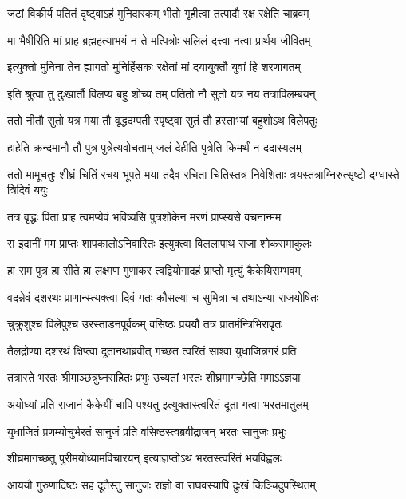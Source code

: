 \twolineshloka
{जटां विकीर्य पतितं दृष्ट्वाऽहं मुनिदारकम्}
{भीतो गृहीत्वा तत्पादौ रक्ष रक्षेति चाब्रवम्} %

\twolineshloka
{मा भैषीरिति मां प्राह ब्रह्महत्याभयं न ते}
{मत्पित्रोः सलिलं दत्त्वा नत्वा प्रार्थय जीवितम्} %

\twolineshloka
{इत्युक्तो मुनिना तेन ह्यागतो मुनिहिंसकः}
{रक्षेतां मां दयायुक्तौ युवां हि शरणागतम्} %

\twolineshloka
{इति श्रुत्वा तु दुःखार्तौ विलप्य बहु शोच्य तम्}
{पतितो नौ सुतो यत्र नय तत्राविलम्बयन्} %

\twolineshloka
{ततो नीतौ सुतो यत्र मया तौ वृद्धदम्पती}
{स्पृष्ट्वा सुतं तौ हस्ताभ्यां बहुशोऽथ विलेपतुः} %

\twolineshloka
{हाहेति क्रन्दमानौ तौ पुत्र पुत्रेत्यवोचताम्}
{जलं देहीति पुत्रेति किमर्थं न ददास्यलम्} %

\threelineshloka
{ततो मामूचतुः शीघ्रं चितिं रचय भूपते}
{मया तदैव रचिता चितिस्तत्र निवेशिताः}
{त्रयस्तत्राग्निरुत्सृष्टो दग्धास्ते त्रिदिवं ययुः} %

\twolineshloka
{तत्र वृद्धः पिता प्राह त्वमप्येवं भविष्यसि}
{पुत्रशोकेन मरणं प्राप्स्यसे वचनान्मम} %

\twolineshloka
{स इदानीं मम प्राप्तः शापकालोऽनिवारितः}
{इत्युक्त्वा विललापाथ राजा शोकसमाकुलः} %

\twolineshloka
{हा राम पुत्र हा सीते हा लक्ष्मण गुणाकर}
{त्वद्वियोगादहं प्राप्तो मृत्युं कैकेयिसम्भवम्} %

\twolineshloka
{वदन्नेवं दशरथः प्राणान्स्त्यक्त्वा दिवं गतः}
{कौसल्या च सुमित्रा च तथाऽन्या राजयोषितः} %

\twolineshloka
{चुक्रुशुश्च विलेपुश्च उरस्ताडनपूर्वकम्}
{वसिष्ठः प्रययौ तत्र प्रातर्मन्त्रिभिरावृतः} %

\twolineshloka
{तैलद्रोण्यां दशरथं क्षिप्त्वा दूतानथाब्रवीत्}
{गच्छत त्वरितं साश्वा युधाजिन्नगरं प्रति} %

\twolineshloka
{तत्रास्ते भरतः श्रीमाञ्छत्रुघ्नसहितः प्रभुः}
{उच्यतां भरतः शीघ्रमागच्छेति ममाऽऽज्ञया} %

\twolineshloka
{अयोध्यां प्रति राजानं कैकेयीं चापि पश्यतु}
{इत्युक्तास्त्वरितं दूता गत्वा भरतमातुलम्} %

\twolineshloka
{युधाजितं प्रणम्योचुर्भरतं सानुजं प्रति}
{वसिष्ठस्त्वब्रवीद्राजन् भरतः सानुजः प्रभुः} %

\twolineshloka
{शीघ्रमागच्छतु पुरीमयोध्यामविचारयन्}
{इत्याज्ञप्तोऽथ भरतस्त्वरितं भयविह्वलः} %

\twolineshloka
{आययौ गुरुणादिष्टः सह दूतैस्तु सानुजः}
{राज्ञो वा राघवस्यापि दुःखं किञ्चिदुपस्थितम्} %

